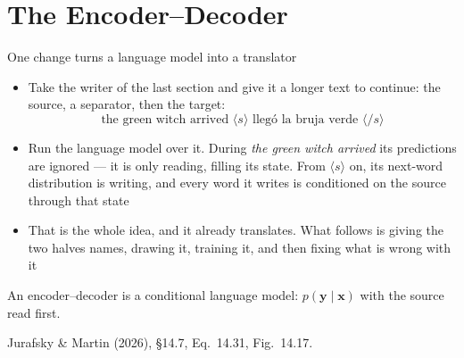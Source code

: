 \documentclass[aspectratio=169, 11pt]{beamer}
\newcommand{\srcline}[1]{%
  \par\vspace{0.25em}%
  {\scriptsize\color{mcMuted}\hfill #1\par}}
\newcommand{\bos}{\langle s\rangle}
\newcommand{\eos}{\langle/s\rangle}
\newcommand{\src}[3]{}      %
\begin{document}
\section{The Encoder--Decoder}

\begin{frame}{One change turns a language model into a translator}
  \src{jurafsky_slp3}{equation}{14.31}
  \src{jurafsky_slp3}{figure}{14.17}
  \src{jurafsky_slp3}{section}{14.7}
  \vspace{-0.1em}
  {\footnotesize
  \begin{itemize}\itemsep0.30em
    \item Take the writer of the last section and give it a longer text
          to continue: the source, a separator, then the target:
          \[
            \text{the \ green \ witch \ arrived \ } \bos \text{ \ lleg\'o \ la \ bruja \ verde \ } \eos
          \]
    \item Run the language model over it. During \emph{the green witch
          arrived} its predictions are ignored --- it is only
          \alert{reading}, filling its state. From $\bos$ on, its next-word
          distribution is \alert{writing}, and every word it writes is
          conditioned on the source through that state
    \item That is the whole idea, and it already translates. What follows
          is giving the two halves names, drawing it, training it, and
          then fixing what is wrong with it
  \end{itemize}}
  \vspace{0.2em}
  \begin{redhighlight}
    An encoder--decoder is a conditional language model:
    $p(\mathbf{y} \mid \mathbf{x})$ with the source read first.
  \end{redhighlight}
  \srcline{Jurafsky \& Martin (2026), \S14.7, Eq.~14.31, Fig.~14.17.}
\end{frame}
\end{document}
